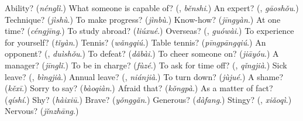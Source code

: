 \begin{tcolorbox}[breakable,colback=teal!4,colframe=teal!35!black,title={Before you move on}]
Ability? (\emph{nénglì}.) What someone is capable of? (\textbf{}, \emph{běnshi}.) An expert? (\textbf{}, \emph{gāoshǒu}.) Technique? (\emph{jìshù}.) To make progress? (\emph{jìnbù}.) Know-how? (\emph{jīngyàn}.) At one time? (\emph{céngjīng}.) To study abroad? (\emph{liúxué}.) Overseas? (\textbf{}, \emph{guówài}.) To experience for yourself? (\emph{tǐyàn}.) Tennis? (\emph{wǎngqiú}.) Table tennis? (\emph{pīngpāngqiú}.) An opponent? (\textbf{}, \emph{duìshǒu}.) To defeat? (\emph{dǎbài}.) To cheer someone on? (\emph{jiāyóu}.) A manager? (\emph{jīnglǐ}.) To be in charge? (\emph{fùzé}.) To ask for time off? (\textbf{}, \emph{qǐngjià}.) Sick leave? (\textbf{}, \emph{bìngjià}.) Annual leave? (\textbf{}, \emph{niánjià}.) To turn down? (\emph{jùjué}.) A shame? (\emph{kěxī}.) Sorry to say? (\emph{bàoqiàn}.) Afraid that? (\emph{kǒngpà}.) As a matter of fact? (\emph{qíshí}.) Shy? (\emph{hàixiū}.) Brave? (\emph{yǒnggǎn}.) Generous? (\emph{dàfang}.) Stingy? (\textbf{}, \emph{xiǎoqì}.) Nervous? (\emph{jǐnzhāng}.)
\end{tcolorbox}
